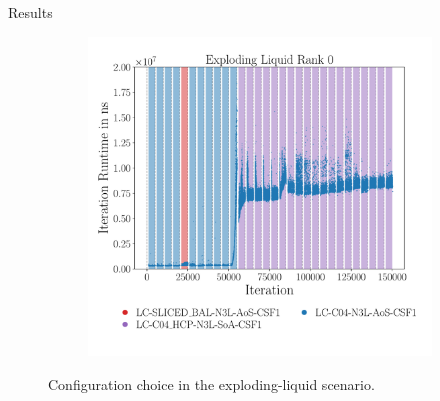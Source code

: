 \begin{frame}[c]{Results}{}
{\begin{figure}[htpb]
\begin{subfigure}{0.45\textwidth}
			\end{subfigure}%
			\begin{subfigure}{0.45\textwidth}
				\vskip 0pt
				\centering
				\includegraphics[width=\textwidth]{plots/exploding-liquid_configs_static.pdf}
				\vspace*{-1.075cm}
			\end{subfigure}
			\vspace{0.1cm}
			\caption{Configuration choice in the exploding-liquid scenario.}
			\label{fig:expl_optimality}
		\end{figure}
	}
\end{frame}
